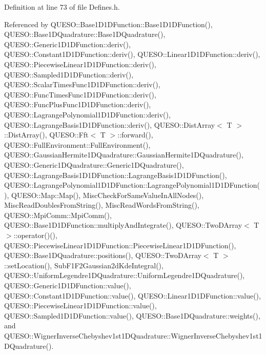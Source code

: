 Definition at line 73 of file Defines.\-h.



Referenced by Q\-U\-E\-S\-O\-::\-Base1\-D1\-D\-Function\-::\-Base1\-D1\-D\-Function(), Q\-U\-E\-S\-O\-::\-Base1\-D\-Quadrature\-::\-Base1\-D\-Quadrature(), Q\-U\-E\-S\-O\-::\-Generic1\-D1\-D\-Function\-::deriv(), Q\-U\-E\-S\-O\-::\-Constant1\-D1\-D\-Function\-::deriv(), Q\-U\-E\-S\-O\-::\-Linear1\-D1\-D\-Function\-::deriv(), Q\-U\-E\-S\-O\-::\-Piecewise\-Linear1\-D1\-D\-Function\-::deriv(), Q\-U\-E\-S\-O\-::\-Sampled1\-D1\-D\-Function\-::deriv(), Q\-U\-E\-S\-O\-::\-Scalar\-Times\-Func1\-D1\-D\-Function\-::deriv(), Q\-U\-E\-S\-O\-::\-Func\-Times\-Func1\-D1\-D\-Function\-::deriv(), Q\-U\-E\-S\-O\-::\-Func\-Plus\-Func1\-D1\-D\-Function\-::deriv(), Q\-U\-E\-S\-O\-::\-Lagrange\-Polynomial1\-D1\-D\-Function\-::deriv(), Q\-U\-E\-S\-O\-::\-Lagrange\-Basis1\-D1\-D\-Function\-::deriv(), Q\-U\-E\-S\-O\-::\-Dist\-Array$<$ T $>$\-::\-Dist\-Array(), Q\-U\-E\-S\-O\-::\-Fft$<$ T $>$\-::forward(), Q\-U\-E\-S\-O\-::\-Full\-Environment\-::\-Full\-Environment(), Q\-U\-E\-S\-O\-::\-Gaussian\-Hermite1\-D\-Quadrature\-::\-Gaussian\-Hermite1\-D\-Quadrature(), Q\-U\-E\-S\-O\-::\-Generic1\-D\-Quadrature\-::\-Generic1\-D\-Quadrature(), Q\-U\-E\-S\-O\-::\-Lagrange\-Basis1\-D1\-D\-Function\-::\-Lagrange\-Basis1\-D1\-D\-Function(), Q\-U\-E\-S\-O\-::\-Lagrange\-Polynomial1\-D1\-D\-Function\-::\-Lagrange\-Polynomial1\-D1\-D\-Function(), Q\-U\-E\-S\-O\-::\-Map\-::\-Map(), Misc\-Check\-For\-Same\-Value\-In\-All\-Nodes(), Misc\-Read\-Doubles\-From\-String(), Misc\-Read\-Words\-From\-String(), Q\-U\-E\-S\-O\-::\-Mpi\-Comm\-::\-Mpi\-Comm(), Q\-U\-E\-S\-O\-::\-Base1\-D1\-D\-Function\-::multiply\-And\-Integrate(), Q\-U\-E\-S\-O\-::\-Two\-D\-Array$<$ T $>$\-::operator()(), Q\-U\-E\-S\-O\-::\-Piecewise\-Linear1\-D1\-D\-Function\-::\-Piecewise\-Linear1\-D1\-D\-Function(), Q\-U\-E\-S\-O\-::\-Base1\-D\-Quadrature\-::positions(), Q\-U\-E\-S\-O\-::\-Two\-D\-Array$<$ T $>$\-::set\-Location(), Sub\-F1\-F2\-Gaussian2d\-Kde\-Integral(), Q\-U\-E\-S\-O\-::\-Uniform\-Legendre1\-D\-Quadrature\-::\-Uniform\-Legendre1\-D\-Quadrature(), Q\-U\-E\-S\-O\-::\-Generic1\-D1\-D\-Function\-::value(), Q\-U\-E\-S\-O\-::\-Constant1\-D1\-D\-Function\-::value(), Q\-U\-E\-S\-O\-::\-Linear1\-D1\-D\-Function\-::value(), Q\-U\-E\-S\-O\-::\-Piecewise\-Linear1\-D1\-D\-Function\-::value(), Q\-U\-E\-S\-O\-::\-Sampled1\-D1\-D\-Function\-::value(), Q\-U\-E\-S\-O\-::\-Base1\-D\-Quadrature\-::weights(), and Q\-U\-E\-S\-O\-::\-Wigner\-Inverse\-Chebyshev1st1\-D\-Quadrature\-::\-Wigner\-Inverse\-Chebyshev1st1\-D\-Quadrature().


